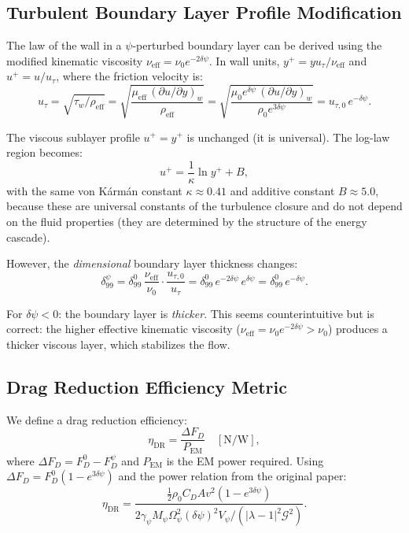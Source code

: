 \documentclass[12pt,twocolumn]{article}
\newcommand{\Reff}{\mathrm{eff}}
\newcommand{\dpsi}{\delta\psi}
\newcommand{\half}{\tfrac{1}{2}}
\begin{document}
\subsection{Turbulent Boundary Layer Profile Modification}

The law of the wall in a $\psi$-perturbed boundary layer can be derived
using the modified kinematic viscosity $\nu_\Reff = \nu_0 e^{-2\dpsi}$.
In wall units, $y^+ = y u_\tau/\nu_\Reff$ and $u^+ = u/u_\tau$, where
the friction velocity is:
\begin{equation}
u_\tau = \sqrt{\tau_w/\rho_\Reff}
= \sqrt{\frac{\mu_\Reff\,(\partial u/\partial y)_w}{\rho_\Reff}}
= \sqrt{\frac{\mu_0 e^{\dpsi}\,(\partial u/\partial y)_w}
{\rho_0 e^{3\dpsi}}}
= u_{\tau,0}\,e^{-\dpsi}.
\end{equation}

The viscous sublayer profile $u^+ = y^+$ is unchanged (it is universal).
The log-law region becomes:
\begin{equation}
u^+ = \frac{1}{\kappa}\ln y^+ + B,
\end{equation}
with the same von K\'arm\'an constant $\kappa \approx 0.41$ and additive
constant $B \approx 5.0$, because these are universal constants of the
turbulence closure and do not depend on the fluid properties (they are
determined by the structure of the energy cascade).

However, the \emph{dimensional} boundary layer thickness changes:
\begin{equation}
\delta_{99}^\psi = \delta_{99}^0\,\frac{\nu_\Reff}{\nu_0}
\cdot\frac{u_{\tau,0}}{u_\tau}
= \delta_{99}^0\,e^{-2\dpsi}\,e^{\dpsi} = \delta_{99}^0\,e^{-\dpsi}.
\end{equation}

For $\dpsi < 0$: the boundary layer is \emph{thicker}. This seems
counterintuitive but is correct: the higher effective kinematic viscosity
($\nu_\Reff = \nu_0 e^{-2\dpsi} > \nu_0$) produces a thicker viscous
layer, which stabilizes the flow.

\subsection{Drag Reduction Efficiency Metric}

We define a drag reduction efficiency:
\begin{equation}
\eta_\mathrm{DR} = \frac{\Delta F_D}{P_\mathrm{EM}}\quad
[\mathrm{N/W}],
\end{equation}
where $\Delta F_D = F_D^0 - F_D^\psi$ and $P_\mathrm{EM}$ is the EM
power required. Using $\Delta F_D = F_D^0(1 - e^{3\dpsi})$ and the
power relation from the original paper:
\begin{equation}
\eta_\mathrm{DR} = \frac{\half\rho_0 C_D A v^2(1 - e^{3\dpsi})}
{2\gamma_\psi M_\psi\Omega_\psi^2(\dpsi)^2 V_\psi
/(|\lambda-1|^2\mathcal{G}^2)}.
\end{equation}
\end{document}
